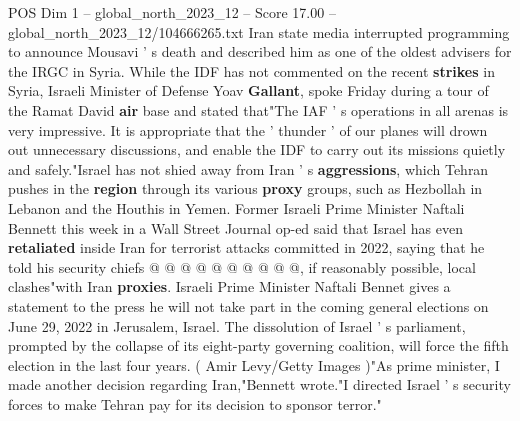 \begin{textsample}{POS Dim 1 – global\_north\_2023\_12 – Score 17.00 – global\_north\_2023\_12/104666265.txt}
Iran state media interrupted programming to announce Mousavi ' s death and described him as one of the oldest advisers for the IRGC in Syria.
While the IDF has not commented on the recent \textbf{strikes} in Syria, Israeli Minister of Defense Yoav \textbf{Gallant}, spoke Friday during a tour of the Ramat David \textbf{air} base and stated that"The IAF ' s operations in all arenas is very impressive.
It is appropriate that the ' thunder ' of our planes will drown out unnecessary discussions, and enable the IDF to carry out its missions quietly and safely."Israel has not shied away from Iran ' s \textbf{aggressions}, which Tehran pushes in the \textbf{region} through its various \textbf{proxy} groups, such as Hezbollah in Lebanon and the Houthis in Yemen.
Former Israeli Prime Minister Naftali Bennett this week in a Wall Street Journal op-ed said that Israel has even \textbf{retaliated} inside Iran for terrorist attacks committed in 2022, saying that he told his security chiefs @ @ @ @ @ @ @ @ @ @, if reasonably possible, local clashes"with Iran \textbf{proxies}.
Israeli Prime Minister Naftali Bennet gives a statement to the press he will not take part in the coming general elections on June 29, 2022 in Jerusalem, Israel.
The dissolution of Israel ' s parliament, prompted by the collapse of its eight-party governing coalition, will force the fifth election in the last four years. ( Amir Levy/Getty Images )"As prime minister, I made another decision regarding Iran,"Bennett wrote."I directed Israel ' s security forces to make Tehran pay for its decision to sponsor terror."

\end{textsample}
